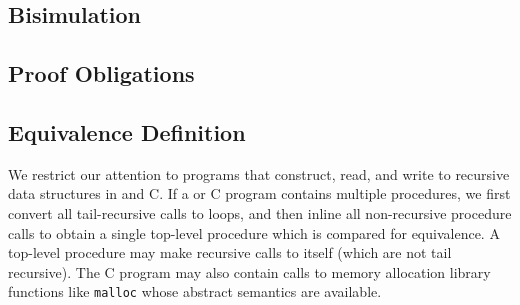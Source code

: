 





\subsection{Bisimulation}
\label{sec:bisim}

\subsection{Proof Obligations}
\label{sec:proofobl}

\subsection{Equivalence Definition}
\label{sec:eqdef}


We restrict
our attention to programs that construct, read, and write to recursive
data structures in \SpecL{} and C.
If a \SpecL{} or C program contains multiple procedures, we first
convert all tail-recursive calls to loops, and then inline
all non-recursive procedure calls to obtain a single top-level procedure which is
compared for equivalence.
A top-level procedure
may make recursive calls to itself (which are not tail recursive).
The C program
may also contain calls to memory allocation library functions
like {\tt malloc} whose
abstract semantics are available.


